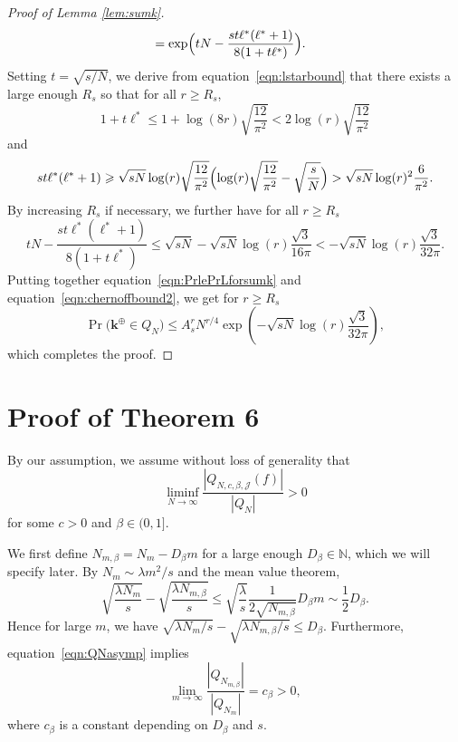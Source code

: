 \documentclass{article}
\theoremstyle{definition}
\renewcommand{\leq}{\leqslant}
\renewcommand{\geq}{\geqslant}
\newcommand{\cj}{\mathcal{J}}
\newcommand{\natu}{\mathbb{N}}
\newcommand{\bsk}{\boldsymbol{k}}
\begin{document}
\begin{proof}[Proof of Lemma \ref{lem:sumk}]
\begin{align}
    &= \exp\Bigl(tN-\frac{st\ell^*(\ell^*+1)}{8(1+t\ell^*)}\Bigr).\nonumber
    \end{align}
    Setting $t=\sqrt{s/N}$, we derive from equation~\eqref{eqn:lstarbound} that there exists a large enough $R_s$ so that for all $r\geq R_s$,
    $$1+t\ell^*\leq 1+\log(8r)\sqrt{\frac{12}{\pi^2 }}<2\log(r)\sqrt{\frac{12}{\pi^2 }}$$
    and
    $$st\ell^*(\ell^*+1)\geq  \sqrt{sN}\log(r)\sqrt{\frac{12}{\pi^2 }}\Bigl(\log(r)\sqrt{\frac{12}{\pi^2 }}-\sqrt{\frac{s}{N}}\Bigr)> \sqrt{sN}\log(r)^2\frac{6}{\pi^2}.$$
    By increasing $R_s$ if necessary, we further have for all $r\geq R_s$
    $$tN-\frac{st\ell^*(\ell^*+1)}{8(1+t\ell^*)}\leq \sqrt{sN}-\sqrt{sN}\log(r)\frac{\sqrt{3}}{16\pi}<-\sqrt{sN}\log(r)\frac{\sqrt{3}}{32\pi}.$$
    Putting together equation~\eqref{eqn:PrlePrLforsumk} and equation~\eqref{eqn:chernoffbound2}, we get for $r\geq R_s$
    $$\Pr\big(\bsk^\oplus\in Q_N\big)\leq A^r_sN^{r/4}\exp(-\sqrt{sN}\log(r)\frac{\sqrt{3}}{32\pi}),$$
    which completes the proof.
\end{proof}

\section{Proof of Theorem 6}
By our assumption, we assume without loss of generality that
\begin{equation}\label{eqn:thm6}
\liminf_{N\to\infty}\frac{|Q_{N,c,\beta,\cj}(f)|}{|Q_{N}|} >0     
\end{equation}
for some $c>0$ and $\beta\in (0,1]$.

 We first define $N_{m,\beta}=N_m-D_\beta m$ for a large enough $D_\beta\in \natu$, which we will specify later.  By $N_m\sim \lambda m^2/s$ and the mean value theorem,
\begin{equation*}
    \sqrt{\frac{\lambda N_m}{s}}-\sqrt{\frac{\lambda N_{m,\beta}}{s}}\leq \sqrt{\frac{\lambda}{s}}  \frac{1}{2\sqrt{ N_{m,\beta} }}D_\beta m\sim \frac{1}{2}D_\beta. 
\end{equation*}
Hence for large $m$, we have $\sqrt{\lambda N_m/s}-\sqrt{\lambda N_{m,\beta}/s} \leq D_\beta$. Furthermore,  equation~\eqref{eqn:QNasymp} implies 
\begin{equation}\label{eqn:QNbetacount}
    \lim_{m\to\infty}\frac{|Q_{N_{m,\beta} }|}{|Q_{N_m}|}= c_{\beta}>0,
\end{equation}
where $c_{\beta}$ is a constant depending on $D_\beta$ and $s$.
\end{document}
